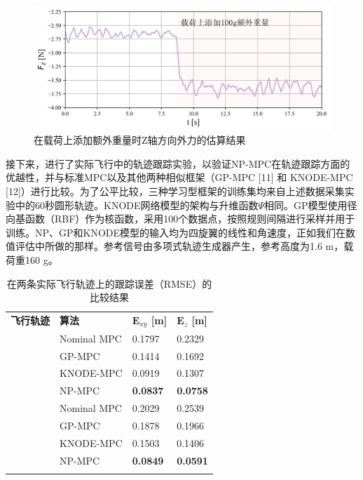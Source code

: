 \documentclass[lang=chs, degree=master, blindreview=false, winfonts=true]{yanputhesis}
\begin{document}
\begin{figure}[hbt!]
	\centering
	\includegraphics[width=38pc]{picture/kk/force.png} 
	\caption{在载荷上添加额外重量时Z轴方向外力的估算结果} 
	\label{force}
\end{figure}
接下来，进行了实际飞行中的轨迹跟踪实验，以验证NP-MPC在轨迹跟踪方面的优越性，并与标准MPC以及其他两种相似框架（GP-MPC [11] 和 KNODE-MPC [12]）进行比较。为了公平比较，三种学习型框架的训练集均来自上述数据采集实验中的60秒圆形轨迹。KNODE网络模型的架构与升维函数$\Psi$相同。GP模型使用径向基函数（RBF）作为核函数，采用100个数据点，按照规则间隔进行采样并用于训练。NP、GP和KNODE模型的输入均为四旋翼的线性和角速度，正如我们在数值评估中所做的那样。参考信号由多项式轨迹生成器产生，参考高度为1.6 m，载荷重160 g。


\renewcommand\arraystretch{1.15}
\begin{table}[htb!]
    \centering
    \caption{在两条实际飞行轨迹上的跟踪误差（RMSE）的比较结果}
    \label{table_xyz}
    \renewcommand\arraystretch{1.5} %
    \begin{tabular}{m{2.2cm}<{\centering} m{2.5cm}<{\centering} m{2.2cm}<{\centering} m{2.2cm}<{\centering}}
        \Xhline{1.pt}
        \textbf{飞行轨迹} & \textbf{算法} & \textbf{$\bm E_{xy}$ [m]} & \textbf{$\bm E_z$ [m]} \\
        \Xhline{1.pt}
        & Nominal MPC & 0.1797 & 0.2329 \\
        \multirow{2}{2.2cm}{\centering {圆}} & GP-MPC & 0.1414 & 0.1692 \\
        & KNODE-MPC & {0.0919} & {0.1307} \\
        & NP-MPC & \textbf{0.0837} & \textbf{0.0758} \\
        \hline
        & Nominal MPC & 0.2029 & 0.2539 \\
        \multirow{2}{2.2cm}{\centering {双纽线}} & GP-MPC & 0.1878 & 0.1966 \\
        & KNODE-MPC & {0.1503} & {0.1406} \\
        & NP-MPC & \textbf{0.0849} & \textbf{0.0591} \\
        \hline
        \Xhline{1.pt}
    \end{tabular}    
\end{table}
\end{document}
